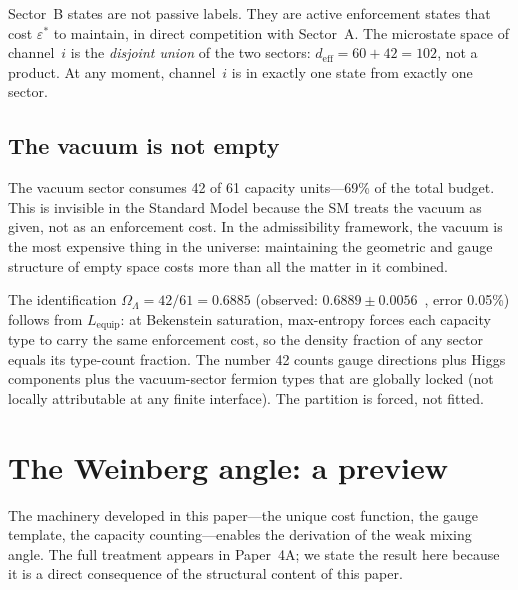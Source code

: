 \documentclass[11pt]{article}
\begin{document}
Sector~B states are not passive labels.  They are active enforcement states that cost $\varepsilon^*$ to maintain, in direct competition with Sector~A.  The microstate space of channel~$i$ is the \emph{disjoint union} of the two sectors: $d_{\mathrm{eff}} = 60 + 42 = 102$, not a product.  At any moment, channel~$i$ is in exactly one state from exactly one sector.


\subsection{The vacuum is not empty}

The vacuum sector consumes 42 of 61 capacity units---69\% of the total budget.  This is invisible in the Standard Model because the SM treats the vacuum as given, not as an enforcement cost.  In the admissibility framework, the vacuum is the most expensive thing in the universe: maintaining the geometric and gauge structure of empty space costs more than all the matter in it combined.

The identification $\Omega_\Lambda = 42/61 = 0.6885$ (observed: $0.6889 \pm 0.0056$~\cite{Planck2020}, error 0.05\%) follows from $L_{\mathrm{equip}}$: at Bekenstein saturation, max-entropy forces each capacity type to carry the same enforcement cost, so the density fraction of any sector equals its type-count fraction.  The number 42 counts gauge directions plus Higgs components plus the vacuum-sector fermion types that are globally locked (not locally attributable at any finite interface).  The partition is forced, not fitted.


\section{The Weinberg angle: a preview}
\label{sec:weinberg}

The machinery developed in this paper---the unique cost function, the gauge template, the capacity counting---enables the derivation of the weak mixing angle.  The full treatment appears in Paper~4A; we state the result here because it is a direct consequence of the structural content of this paper.
\end{document}
